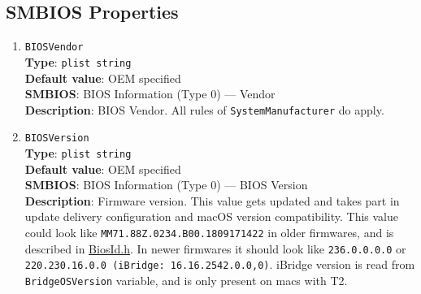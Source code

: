 \documentclass[]{article}
\begin{document}
\begin{enumerate}
\end{enumerate}

\subsection{SMBIOS Properties}\label{platforminfosmbios}

\begin{enumerate}
\item
  \texttt{BIOSVendor}\\
  \textbf{Type}: \texttt{plist\ string}\\
  \textbf{Default value}: OEM specified\\
  \textbf{SMBIOS}: BIOS Information (Type 0) --- Vendor\\
  \textbf{Description}: BIOS Vendor. All rules of
  \texttt{SystemManufacturer} do apply.
\item
  \texttt{BIOSVersion}\\
  \textbf{Type}: \texttt{plist\ string}\\
  \textbf{Default value}: OEM specified\\
  \textbf{SMBIOS}: BIOS Information (Type 0) --- BIOS Version\\
  \textbf{Description}: Firmware version. This value gets updated and
  takes part in update delivery configuration and macOS version
  compatibility. This value could look like
  \texttt{MM71.88Z.0234.B00.1809171422} in older firmwares, and is
  described in
  \href{https://github.com/acidanthera/EfiPkg/blob/master/Include/Guid/BiosId.h}{BiosId.h}.
  In newer firmwares it should look like \texttt{236.0.0.0.0} or
  \texttt{220.230.16.0.0\ (iBridge:\ 16.16.2542.0.0,0)}. iBridge version
  is read from \texttt{BridgeOSVersion} variable, and is only present on
  macs with T2.


\end{enumerate}
\end{document}
